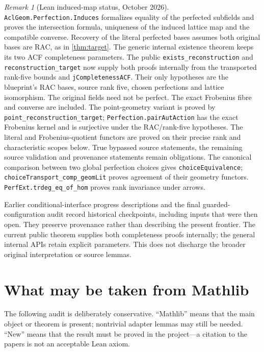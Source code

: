 \documentclass[11pt,oneside]{article}
\theoremstyle{definition}
\theoremstyle{remark}
\newtheorem{remark}[theorem]{Remark}
\newcommand{\lean}[1]{\nolinkurl{#1}}
\begin{document}
\begin{remark}[Lean induced-map status, October 2026]
\label{rem:lean-current-status}
\lean{AclGeom.Perfection.Induces} formalizes equality of the perfected subfields and proves
the intersection formula, uniqueness of the induced lattice map and the compatible
converse.  Recovery of the literal perfected bases assumes both original bases are RAC,
as in \cref{thm:target}.  The generic internal existence theorem keeps its two ACF
completeness parameters.  The public \lean{exists_reconstruction} and
\lean{reconstruction_target} now supply both proofs internally from the transported
rank-five bounds and \lean{jCompletenessACF}.  Their only hypotheses are the blueprint's
RAC bases, source rank five, chosen perfections and lattice isomorphism.  The original
fields need not be perfect.  The exact Frobenius fibre and converse are included.
The point-geometry variant is proved by \lean{point_reconstruction_target};
\lean{Perfection.pairAutAction} has the exact Frobenius kernel and is surjective under
the RAC/rank-five hypotheses.  The literal and Frobenius-quotient functors are proved
on their precise rank and characteristic scopes below.  True bypassed source statements,
the remaining source validation and provenance statements remain obligations.
The canonical comparison between two global perfection choices gives
\lean{choiceEquivalence}; \lean{choiceTransport_comp_geomLit} proves agreement of their
geometry functors.  \lean{PerfExt.trdeg_eq_of_hom} proves rank invariance under arrows.

Earlier conditional-interface progress descriptions and the final guarded-configuration
audit record historical checkpoints, including inputs that were then open.  They preserve
provenance rather than describing the present frontier.  The current public theorem
supplies both completeness proofs internally; the general internal APIs retain explicit
parameters.  This does not discharge the broader original interpretation or source lemmas.
\end{remark}

\section{What may be taken from Mathlib}

The following audit is deliberately conservative.  ``Mathlib'' means that the main
object or theorem is present; nontrivial adapter lemmas may still be needed.  ``New''
means that the result must be proved in the project---a citation to the papers is not an
acceptable Lean axiom.
\end{document}
